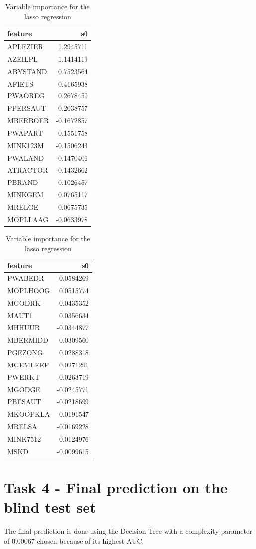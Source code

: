 \documentclass[
  12pt,
  oneside]{report}
\begin{document}
\begin{table}[H]
\caption{\label{tab:unnamed-chunk-23}Variable importance for the lasso regression}

\centering
\fontsize{9}{11}\selectfont
\begin{tabular}[t]{l|r}
\hline
feature & s0\\
\hline
APLEZIER & 1.2945711\\
\hline
AZEILPL & 1.1414119\\
\hline
ABYSTAND & 0.7523564\\
\hline
AFIETS & 0.4165938\\
\hline
PWAOREG & 0.2678450\\
\hline
PPERSAUT & 0.2038757\\
\hline
MBERBOER & -0.1672857\\
\hline
PWAPART & 0.1551758\\
\hline
MINK123M & -0.1506243\\
\hline
PWALAND & -0.1470406\\
\hline
ATRACTOR & -0.1432662\\
\hline
PBRAND & 0.1026457\\
\hline
MINKGEM & 0.0765117\\
\hline
MRELGE & 0.0675735\\
\hline
MOPLLAAG & -0.0633978\\
\hline
\end{tabular}
\centering
\begin{tabular}[t]{l|r}
\hline
feature & s0\\
\hline
PWABEDR & -0.0584269\\
\hline
MOPLHOOG & 0.0515774\\
\hline
MGODRK & -0.0435352\\
\hline
MAUT1 & 0.0356634\\
\hline
MHHUUR & -0.0344877\\
\hline
MBERMIDD & 0.0309560\\
\hline
PGEZONG & 0.0288318\\
\hline
MGEMLEEF & 0.0271291\\
\hline
PWERKT & -0.0263719\\
\hline
MGODGE & -0.0245771\\
\hline
PBESAUT & -0.0218699\\
\hline
MKOOPKLA & 0.0191547\\
\hline
MRELSA & -0.0169228\\
\hline
MINK7512 & 0.0124976\\
\hline
MSKD & -0.0099615\\
\hline
\end{tabular}
\end{table}

\hypertarget{task-4---final-prediction-on-the-blind-test-set}{%
\chapter{Task 4 - Final prediction on the blind test set}\label{task-4---final-prediction-on-the-blind-test-set}}

The final prediction is done using the Decision Tree with a complexity parameter of \(0.00067\) chosen because of its highest AUC.


\singlespacing %
\end{document}
